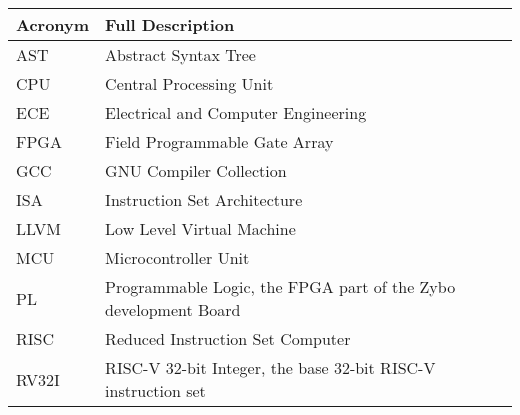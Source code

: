 \begin{table}[H]
	\begin{tabularx}{\textwidth}{| a | x |}
		\hline
		\textbf{Acronym} & \textbf{Full Description}                                       \\
		\hline
		AST              & Abstract Syntax Tree                                            \\
		CPU              & Central Processing Unit                                         \\
		ECE              & Electrical and Computer Engineering                             \\
		FPGA             & Field Programmable Gate Array                                   \\
		GCC              & GNU Compiler Collection                                         \\
		ISA              & Instruction Set Architecture                                    \\
		LLVM             & Low Level Virtual Machine                                       \\
		MCU              & Microcontroller Unit                                            \\
		PL               & Programmable Logic, the FPGA part of the Zybo development Board \\
		RISC             & Reduced Instruction Set Computer                                \\
		RV32I            & RISC-V 32-bit Integer, the base 32-bit RISC-V instruction set   \\
		\hline
	\end{tabularx}
\end{table}

